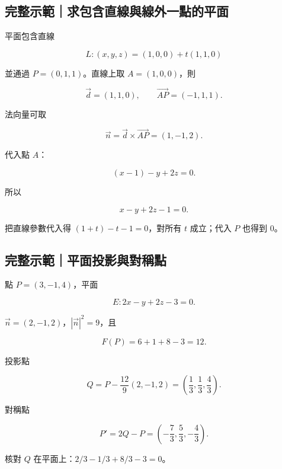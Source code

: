 \documentclass[11pt,a4paper]{article}
\begin{document}
\begin{HandoutWorkedExample}

\subsection{完整示範｜求包含直線與線外一點的平面}\label{ux5b8cux6574ux793aux7bc4ux6c42ux5305ux542bux76f4ux7ddaux8207ux7ddaux5916ux4e00ux9edeux7684ux5e73ux9762}

平面包含直線

\[
L:(x,y,z)=(1,0,0)+t(1,1,0)
\]

並通過 \(P=(0,1,1)\)。直線上取 \(A=(1,0,0)\)，則

\[
\vec d=(1,1,0),
\qquad
\overrightarrow{AP}=(-1,1,1).
\]

法向量可取

\[
\vec n=\vec d\times\overrightarrow{AP}
=(1,-1,2).
\]

代入點 \(A\)：

\[
(x-1)-y+2z=0.
\]

所以

\[
\boxed{x-y+2z-1=0}.
\]

把直線參數代入得 \((1+t)-t-1=0\)，對所有 \(t\) 成立；代入 \(P\) 也得到 \(0\)。

\end{HandoutWorkedExample}

\begin{HandoutWorkedExample}

\subsection{完整示範｜平面投影與對稱點}\label{ux5b8cux6574ux793aux7bc4ux5e73ux9762ux6295ux5f71ux8207ux5c0dux7a31ux9ede}

點 \(P=(3,-1,4)\)，平面

\[
E:2x-y+2z-3=0.
\]

\(\vec n=(2,-1,2)\)，\(|\vec n|^2=9\)，且

\[
F(P)=6+1+8-3=12.
\]

投影點

\[
Q=P-\frac{12}{9}(2,-1,2)
=\boxed{\left(\frac13,\frac13,\frac43\right)}.
\]

對稱點

\[
P'=2Q-P
=\boxed{\left(-\frac73,\frac53,-\frac43\right)}.
\]

核對 \(Q\) 在平面上：\(2/3-1/3+8/3-3=0\)。

\end{HandoutWorkedExample}
\end{document}
